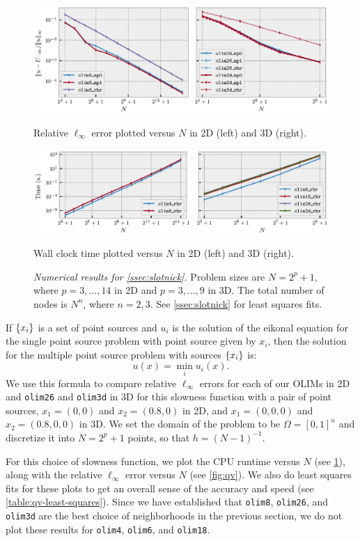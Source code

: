 \documentclass{article}
\begin{document}
\begin{figure}
  \centering
  \includegraphics[width=\linewidth]{qv_plots.eps}%
  \caption{Relative $\ell_\infty$ error plotted versus $N$ in 2D
    (left) and 3D (right).}\label{fig:qv}
  \includegraphics[width=\linewidth]{qv-time-plots.eps}%
  \caption{Wall clock time plotted versus $N$ in 2D (left) and 3D
    (right).}\label{fig:qv-time-plots}
  \caption*{\emph{Numerical results for \cref{ssec:slotnick}.} Problem
    sizes are $N = 2^p + 1$, where $p = 3, \hdots, 14$ in 2D and
    $p = 3, \hdots, 9$ in 3D. The total number of nodes is $N^n$,
    where $n = 2, 3$. See \cref{ssec:slotnick} for least squares
    fits.}
\end{figure}

If $\left\{x_i\right\}$ is a set of point sources and $u_i$ is the solution of
the eikonal equation for the single point source problem with point
source given by $x_i$, then the solution for the multiple point source
problem with sources $\left\{x_i\right\}$ is:
\begin{equation}
  u(x) = \min_i u_i(x).
\end{equation}
We use this formula to compare relative $\ell_\infty$ errors for each
of our OLIMs in 2D and \texttt{olim26} and \texttt{olim3d} in 3D for
this slowness function with a pair of point sources, $x_1 = (0, 0)$
and $x_2 = (0.8, 0)$ in 2D, and $x_1 = (0, 0, 0)$ and
$x_2 = (0.8, 0, 0)$ in 3D. We set the domain of the problem to be
$\Omega = [0, 1]^n$ and discretize it into $N = 2^p + 1$ points, so
that $h = (N-1)^{-1}$.

For this choice of slowness function, we plot the CPU runtime versus
$N$ (see \cref{fig:qv-time-plots}), along with the relative
$\ell_\infty$ error versus $N$ (see \cref{fig:qv}). We also do least
squares fits for these plots to get an overall sense of the accuracy
and speed (see \cref{table:qv-least-squares}). Since we have
established that \texttt{olim8}, \texttt{olim26}, and \texttt{olim3d}
are the best choice of neighborhoods in the previous section, we do
not plot these results for \texttt{olim4}, \texttt{olim6}, and
\texttt{olim18}.
\end{document}
